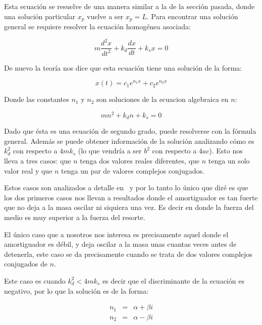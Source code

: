 Esta ecuación se resuelve de una manera similar a la de la sección pasada, donde una solución particular $x_p$ vuelve a ser $x_p = L$.
Para encontrar una solución general se requiere resolver la ecuación homogénea asociada:

\begin{equation}
m \frac{d^2x}{dt^2} + k_d\frac{dx}{dt} + k_s x = 0
\end{equation}

De nuevo la teoría nos dice que esta ecuación tiene una solución de la forma:

\begin{equation}
x(t) = c_1 e^{n_1 x} + c_2 e^{n_2 x} \nonumber
\end{equation}

Donde las constantes $n_1$ y $n_2$ son soluciones de la ecuacion algebraica en $n$:

\begin{equation}
m n^2 +  k_d n + k_s = 0
\end{equation}

Dado que ésta es una ecuación de segundo grado, puede resolverse con la fórmula general.
Además se puede obtener información de la solución analizando cómo es $k_d^2$ con respecto a $4 m k_s$ (lo que vendría a ser $b^2$ con respecto a $4ac$).
Esto nos lleva a tres casos: que $n$ tenga dos valores reales diferentes, que $n$ tenga un solo valor real y que $n$ tenga un par de valores complejos conjugados.

Estos casos son analizados a detalle en~\cite{Ross:Ecuaciones} y por lo tanto lo único que diré es que los dos primeros casos nos llevan a resultados donde el amortiguador es tan fuerte que no deja a la masa oscilar ni siquiera una vez.
Es decir en donde la fuerza del medio es muy superior a la fuerza del resorte.

El único caso que a nosotros nos interesa es precisamente aquel donde el amortiguador es débil, y deja oscilar a la masa unas cuantas veces antes de detenerla, este caso se da precisamente cuando se trata de dos valores complejos conjugados de $n$. 

Este caso es cuando $k_d^2 < 4 m k_s$ es decir que el discriminante de la ecuación es negativo, por lo que la solución es de la forma:

\begin{eqnarray}
n_1 & = & \alpha + \beta i \nonumber \\
n_2 & = & \alpha - \beta i \nonumber
\end{eqnarray}

